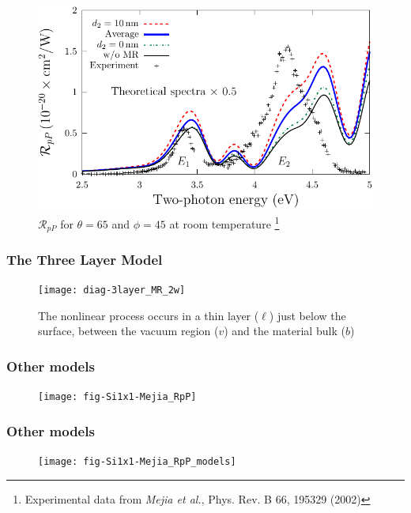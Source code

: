 \documentclass{beamer}
\begin{document}
\begin{frame}
\begin{figure}
\centering
\includegraphics[width=\textwidth]{fig-Si1x1-MRdepth}
\caption{$\mathcal{R}_{pP}$ for $\theta=65$ and $\phi=45$ at room temperature%
\footnote{Experimental data from \emph{Mejia et al.}, Phys. Rev. B 66, 195329 (2002)}}
\end{figure}
\end{frame}

\begin{frame}
\frametitle{The Three Layer Model}
\begin{figure}
\centering
\texttt{[image: diag-3layer\_MR\_2w]}
\caption{The nonlinear process occurs in a thin layer ($\ell$) just below the
surface, between the vacuum region ($v$) and the material bulk ($b$)}
\end{figure}
\end{frame}

\begin{frame}
\frametitle{Other models}
\begin{figure}
\centering
\texttt{[image: fig-Si1x1-Mejia\_RpP]}
\end{figure}
\end{frame}

\begin{frame}
\frametitle{Other models}
\begin{figure}
\centering
\texttt{[image: fig-Si1x1-Mejia\_RpP\_models]}
\end{figure}
\end{frame}
\end{document}
